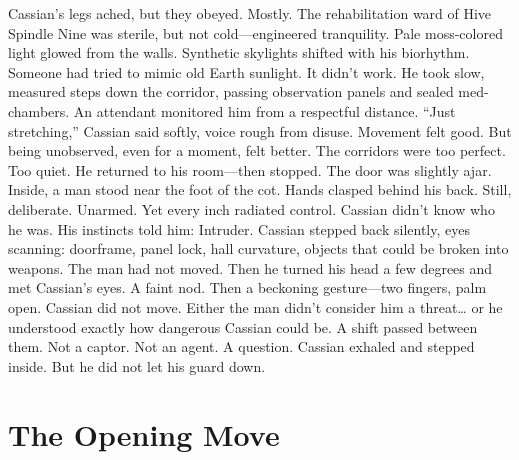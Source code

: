 \documentclass[12pt,oneside]{book}
\begin{document}
Cassian’s legs ached, but they obeyed. Mostly.
The rehabilitation ward of Hive Spindle Nine was sterile, but not cold—engineered tranquility. Pale moss-colored light glowed from the walls. Synthetic skylights shifted with his biorhythm. Someone had tried to mimic old Earth sunlight.
It didn’t work.
He took slow, measured steps down the corridor, passing observation panels and sealed med-chambers. An attendant monitored him from a respectful distance.
“Just stretching,” Cassian said softly, voice rough from disuse.
Movement felt good. But being unobserved, even for a moment, felt better. The corridors were too perfect. Too quiet.
He returned to his room—then stopped.
The door was slightly ajar.
Inside, a man stood near the foot of the cot. Hands clasped behind his back. Still, deliberate. Unarmed. Yet every inch radiated control.
Cassian didn’t know who he was.
His instincts told him:
Intruder.
Cassian stepped back silently, eyes scanning: doorframe, panel lock, hall curvature, objects that could be broken into weapons.
The man had not moved.
Then he turned his head a few degrees and met Cassian’s eyes.
A faint nod.
Then a beckoning gesture—two fingers, palm open.
Cassian did not move.
Either the man didn’t consider him a threat… or he understood exactly how dangerous Cassian could be.
A shift passed between them.
Not a captor.
Not an agent.
A question.
Cassian exhaled and stepped inside.
But he did not let his guard down.



\chapter{The Opening Move}
\end{document}
